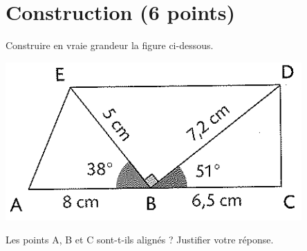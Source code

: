 \section{Construction (6 points)}

\begin{questions}
	\question[3] Construire en vraie grandeur la figure ci-dessous.
	\begin{center}
		\includegraphics[scale=0.7]{img/figure}
	\end{center}

	\question 
		 Les points A, B et C sont-t-ils alignés ? Justifier votre réponse.

\end{questions}